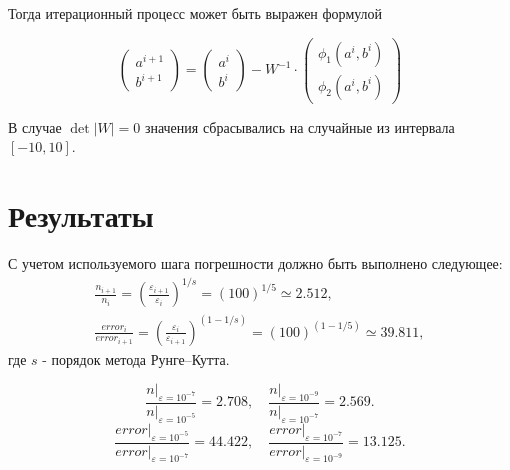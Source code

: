 \documentclass[a4paper,12pt]{article}
\begin{document}
Тогда итерационный процесс может быть выражен формулой

\begin{equation*}
  \begin{pmatrix}
    a^{i+1}\\
    b^{i+1}
  \end{pmatrix}=\begin{pmatrix}
    a^{i}\\
    b^{i}
  \end{pmatrix}-W^{-1}\cdot \begin{pmatrix}
    \phi_1(a^i,b^i)\\
    \phi_2(a^i,b^i)
  \end{pmatrix}
\end{equation*}

В случае \(\det\vert W\vert=0\) значения сбрасывались на случайные из интервала \([-10, 10]\).

\section*{Результаты}


С учетом используемого шага погрешности должно быть выполнено следующее:
\begin{gather*}
  \frac{n_{i+1}}{n_{i}}=\left(\frac{\varepsilon_{i+1}}{\varepsilon_{i}}\right)^{1/s}=\left(100\right)^{1/5}\simeq2.512, \\
  \frac{error_{i}}{error_{i+1}}=\left(\frac{\varepsilon_{i}}{\varepsilon_{i+1}}\right)^{(1-1/s)}=\left(100\right)^{(1-1/5)}\simeq39.811,
\end{gather*}
где \(s\) - порядок метода Рунге--Кутта.

\begin{equation*}
  \frac{\left.n\right\vert_{\varepsilon=10^{-7}}}{\left.n\right\vert_{\varepsilon=10^{-5}}}=2.708, \quad
  \frac{\left.n\right\vert_{\varepsilon=10^{-9}}}{\left.n\right\vert_{\varepsilon=10^{-7}}}=2.569.
\end{equation*}
\begin{equation*}
  \frac{\left.error\right\vert_{\varepsilon=10^{-5}}}{\left.error\right\vert_{\varepsilon=10^{-7}}}=44.422, \quad
  \frac{\left.error\right\vert_{\varepsilon=10^{-7}}}{\left.error\right\vert_{\varepsilon=10^{-9}}}=13.125.
\end{equation*}
\end{document}
